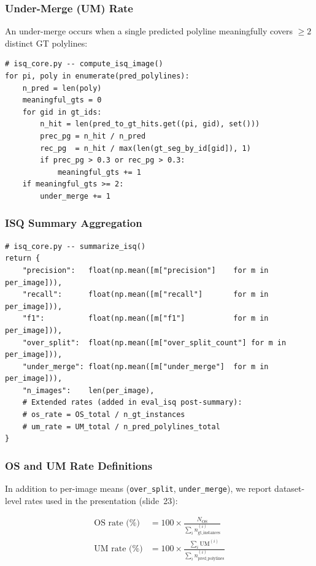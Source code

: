 \documentclass[11pt,a4paper]{article}
\begin{document}
\subsubsection{Under-Merge (UM) Rate}

An under-merge occurs when a single predicted polyline meaningfully
covers $\geq 2$ distinct GT polylines:

\begin{lstlisting}
# isq_core.py -- compute_isq_image()
for pi, poly in enumerate(pred_polylines):
    n_pred = len(poly)
    meaningful_gts = 0
    for gid in gt_ids:
        n_hit = len(pred_to_gt_hits.get((pi, gid), set()))
        prec_pg = n_hit / n_pred
        rec_pg  = n_hit / max(len(gt_seg_by_id[gid]), 1)
        if prec_pg > 0.3 or rec_pg > 0.3:
            meaningful_gts += 1
    if meaningful_gts >= 2:
        under_merge += 1
\end{lstlisting}

\subsubsection{ISQ Summary Aggregation}

\begin{lstlisting}
# isq_core.py -- summarize_isq()
return {
    "precision":   float(np.mean([m["precision"]    for m in per_image])),
    "recall":      float(np.mean([m["recall"]       for m in per_image])),
    "f1":          float(np.mean([m["f1"]           for m in per_image])),
    "over_split":  float(np.mean([m["over_split_count"] for m in per_image])),
    "under_merge": float(np.mean([m["under_merge"]  for m in per_image])),
    "n_images":    len(per_image),
    # Extended rates (added in eval_isq post-summary):
    # os_rate = OS_total / n_gt_instances
    # um_rate = UM_total / n_pred_polylines_total
}
\end{lstlisting}

\subsubsection{OS and UM Rate Definitions}

In addition to per-image means (\texttt{over\_split}, \texttt{under\_merge}),
we report dataset-level rates used in the presentation (slide~23):

\begin{align*}
  \text{OS rate (\%)} &= 100 \times \frac{N_{\text{OS}}}{\sum_i n_{\text{gt\_instances}}^{(i)}} \\
  \text{UM rate (\%)} &= 100 \times \frac{\sum_i \text{UM}^{(i)}}{\sum_i n_{\text{pred\_polylines}}^{(i)}}
\end{align*}
\end{document}
